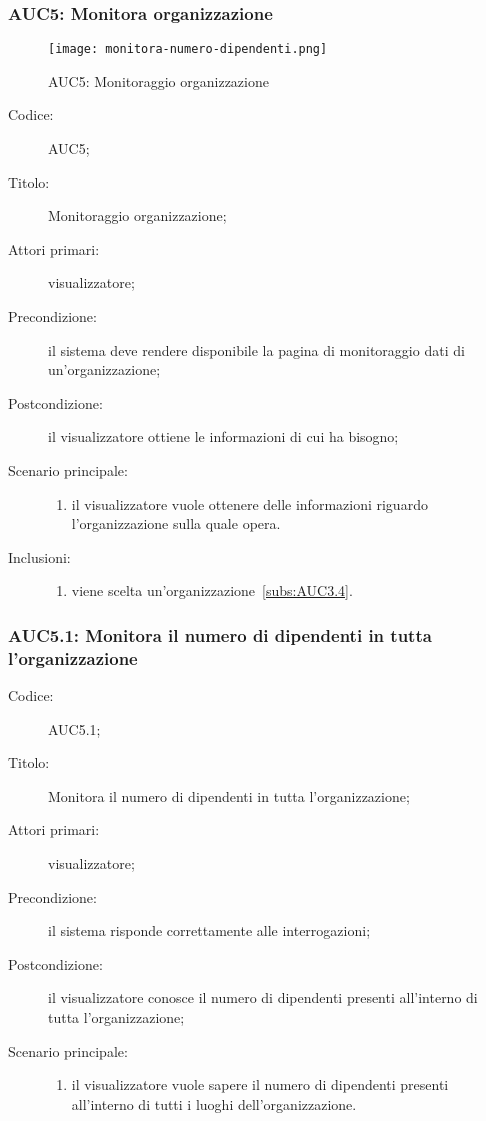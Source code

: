 \documentclass[../../../analisi-dei-requisiti.tex]{subfiles}
\begin{document}
\subsubsection{AUC5: Monitora organizzazione}%
\label{subs:AUC5}

\begin{figure}[H]
  \centering
  \texttt{[image: monitora-numero-dipendenti.png]}
  \caption{AUC5: Monitoraggio organizzazione}%
  \label{fig:AUC5}
\end{figure}

\begin{description}
  \item[Codice:] AUC5;
  \item[Titolo:] Monitoraggio organizzazione;
  \item[Attori primari:] visualizzatore;
  \item[Precondizione:] il sistema deve rendere disponibile la pagina di monitoraggio dati di un'organizzazione;
  \item[Postcondizione:] il visualizzatore ottiene le informazioni di cui ha bisogno;
  \item[Scenario principale:]
  \begin{enumerate}
    \item il visualizzatore vuole ottenere delle informazioni riguardo l'organizzazione sulla quale opera.
  \end{enumerate}
  \item[Inclusioni:]
        \begin{enumerate}
          \item viene scelta un'organizzazione~\ref{subs:AUC3.4}.
        \end{enumerate}
\end{description}

\subsubsection{AUC5.1: Monitora il numero di dipendenti in tutta l'organizzazione}%
\label{subs:AUC5.1}
\begin{description}
  \item[Codice:] AUC5.1;
  \item[Titolo:] Monitora il numero di dipendenti in tutta l'organizzazione;
  \item[Attori primari:] visualizzatore;
  \item[Precondizione:] il sistema risponde correttamente alle interrogazioni;
  \item[Postcondizione:] il visualizzatore conosce il numero di dipendenti presenti all'interno di tutta l'organizzazione;
  \item[Scenario principale:]
  \begin{enumerate}
    \item il visualizzatore vuole sapere il numero di dipendenti presenti all'interno di tutti i luoghi dell'organizzazione.
  \end{enumerate}
\end{description}
\end{document}
